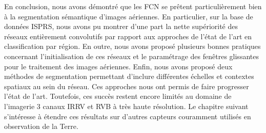 En conclusion, nous avons démontré que les \gls{FCN} se prêtent particulièrement bien à la segmentation sémantique d'images aériennes. En particulier, sur la base de données \gls{ISPRS}, nous avons pu montrer d'une part la nette supériorité des réseaux entièrement convolutifs par rapport aux approches de l'état de l'art en classification par région. En outre, nous avons proposé plusieurs bonnes pratiques concernant l'initialisation de ces réseaux et le paramétrage des fenêtres glissantes pour le traitement des images aériennes. Enfin, nous avons proposé deux méthodes de segmentation permettant d'inclure différentes échelles et contextes spatiaux au sein du réseau. Ces approches nous ont permis de faire progresser l'état de l'art. Toutefois, ces succès restent encore limités au domaine de l'imagerie 3 canaux \gls{IRRV} et \gls{RVB} à très haute résolution. Le chapitre suivant s'intéresse à étendre ces résultats sur d'autres capteurs couramment utilisés en observation de la Terre.

%
%
\printbibliography
